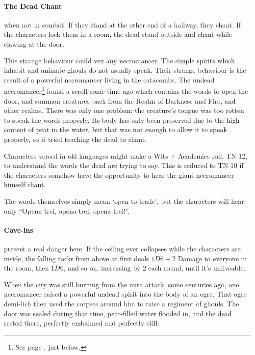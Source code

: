 \begin{multicols}{2}
\paragraph{The Dead Chant} when not in combat.
If they stand at the other end of a hallway, they chant.
If the characters lock them in a room, the dead stand outside and chant while clawing at the door.

This strange behaviour could vex any necromancer.
The simple spirits which inhabit and animate ghouls do not usually speak.
Their strange behaviour is the result of a powerful necromancer living in the catacombs.
The undead necromancer\footnote{See page \pageref{undead_ogre}, just below.} found a scroll some time ago which contains the words to open the door, and summon creatures back from the Realm of Darkness and Fire, and other realms.
There was only one problem: the creature's tongue was too rotten to speak the words properly.
Its body has only been preserved due to the high content of peat in the water, but that was not enough to allow it to speak properly, so it tried teaching the dead to chant.

Characters versed in old languages might make a Wits + Academics roll, TN 12, to understand the words the dead are trying to say.  This is reduced to TN 10 if the characters somehow have the opportunity to hear the giant necromancer himself chant.

The words themselves simply mean `open to trade', but the characters will hear only ``Opena trei, opena trei, opena trei!''.

\paragraph{Cave-ins} present a real danger here.  If the ceiling ever collapses while the characters are inside, the falling rocks from above at first deals $1D6-2$ Damage to everyone in the room, then $1D6$, and so on, increasing by 2 each round, until it's unliveable.



\begin{exampletext}

When the city was still burning from the nura attack, some centuries ago, one necromancer raised a powerful undead spirit into the body of an ogre.
That ogre demi-lich then used the corpses around him to raise a regiment of ghouls.
The door was sealed during that time, peat-filled water flooded in, and the dead rested there, perfectly embalmed and perfectly still.


\end{exampletext}
\end{multicols}
